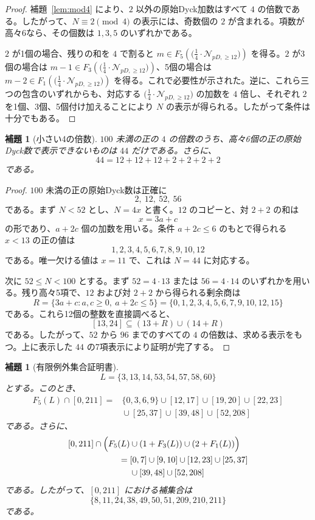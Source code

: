 \documentclass[12pt]{ltjsarticle}
\theoremstyle{plain}
\newtheorem{lemma}[theorem]{補題}
\theoremstyle{definition}
\theoremstyle{plain}
\newcommand{\Pset}{
  \bigl(\tfrac{1}{4}\cdot\mathcal{N}_{pD,\geq 12}\bigr)
}
\begin{document}
\begin{proof}
補題~\ref{lem:mod4} により、$2$ 以外の原始Dyck加数はすべて $4$ の倍数である。したがって、$N\equiv2\pmod4$ の表示には、奇数個の $2$ が含まれる。項数が高々6なら、その個数は $1,3,5$ のいずれかである。

$2$ が1個の場合、残りの和を $4$ で割ると $m\in F_5(\Pset)$ を得る。$2$ が3個の場合は $m-1\in F_3(\Pset)$、5個の場合は $m-2\in F_1(\Pset)$ を得る。これで必要性が示された。逆に、これら三つの包含のいずれからも、対応する $\Pset$ の加数を $4$ 倍し、それぞれ $2$ を1個、3個、5個付け加えることにより $N$ の表示が得られる。したがって条件は十分でもある。
\end{proof}

\begin{lemma}[小さい4の倍数]\label{lem:smallmultiples}
$100$ 未満の正の $4$ の倍数のうち、高々6個の正の原始Dyck数で表示できないものは $44$ だけである。さらに、
\[
 44=12+12+12+2+2+2+2
\]
である。
\end{lemma}

\begin{proof}
$100$ 未満の正の原始Dyck数は正確に
\[
 2,\ 12,\ 52,\ 56
\]
である。まず $N<52$ とし、$N=4x$ と書く。$12$ のコピーと、対 $2+2$ の和は
\[
 x=3a+c
\]
の形であり、$a+2c$ 個の加数を用いる。条件 $a+2c\leq6$ のもとで得られる $x<13$ の正の値は
\[
 1,2,3,4,5,6,7,8,9,10,12
\]
である。唯一欠ける値は $x=11$ で、これは $N=44$ に対応する。

次に $52\leq N<100$ とする。まず $52=4\cdot13$ または $56=4\cdot14$ のいずれかを用いる。残り高々5項で、$12$ および対 $2+2$ から得られる剰余商は
\[
 R=\{3a+c:a,c\geq0,\ a+2c\leq5\}
   =\{0,1,2,3,4,5,6,7,9,10,12,15\}
\]
である。これら12個の整数を直接調べると、
\[
 [13,24]\subseteq(13+R)\cup(14+R)
\]
である。したがって、$52$ から $96$ までのすべての $4$ の倍数は、求める表示をもつ。上に表示した $44$ の7項表示により証明が完了する。
\end{proof}

\begin{lemma}[有限例外集合証明書]\label{lem:finiteexception}
\[
 L=\{3,13,14,53,54,57,58,60\}
\]
とする。このとき、
\[
\begin{aligned}
F_5(L)\cap[0,211]
={}&\{0,3,6,9\}\cup[12,17]\cup[19,20]\cup[22,23]\\
 &{}\cup[25,37]\cup[39,48]\cup[52,208]
\end{aligned}
\]
である。さらに、
\[
\begin{aligned}
[0,211]\cap\Bigl(F_5(L)&\cup(1+F_3(L))\cup(2+F_1(L))\Bigr)\\
={}&[0,7]\cup[9,10]\cup[12,23]\cup[25,37]\\
 &{}\cup[39,48]\cup[52,208]
\end{aligned}
\]
である。したがって、$[0,211]$ における補集合は
\[
 \{8,11,24,38,49,50,51,209,210,211\}
\]
である。
\end{lemma}
\end{document}
